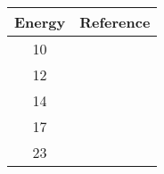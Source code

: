 \begin{tabular}{c c} 
    \toprule
    \bf{Energy} & \bf{Reference} \\
    \midrule
    10 & \cite{Anli1989}\\
    12 & \cite{Anli1989}\\
    14 & \cite{Anli1989}\\
    17 & \cite{Anli1989}\\
    23 & \cite{Lam1985}\\
    \bottomrule
\end{tabular}
